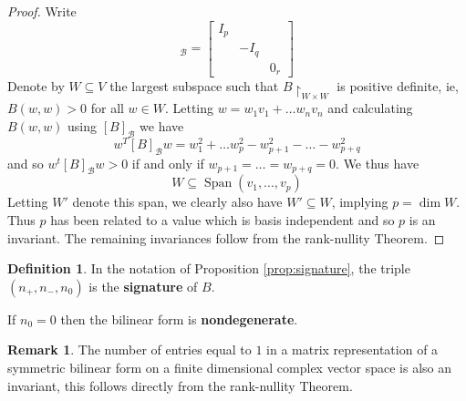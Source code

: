 \documentclass[12pt]{article}
\theoremstyle{plain}
\theoremstyle{definition}
\newtheorem{defn}[thm]{Definition} %
\newtheorem{remark}[thm]{Remark}
\newcommand{\scr}[1]{\mathscr{#1}}
\begin{document}
\begin{proof}
Write
\begin{equation}
[B]_{\scr{B}} = 
\begin{bmatrix}
I_{p} & &\\
& -I_{q} &\\
& & 0_{r}
\end{bmatrix}
\end{equation}
Denote by $W \subseteq V$ the largest subspace such that $B\restriction_{W \times W}$ is positive definite, ie, $B(w,w) > 0$ for all $w\in W$.  Letting $w = w_1v_1 + \hdots w_nv_n$ and calculating $B(w,w)$ using $[B]_{\scr{B}}$ we have
\begin{equation}
w^T[B]_{\scr{B}}w = w_1^2 + \hdots w_p^2 - w_{p+1}^2 - \hdots - w_{p+q}^2
\end{equation}
and so $w^t[B]_{\scr{B}}w >0$ if and only if $w_{p+1} = \hdots = w_{p+q} = 0$. We thus have $$W \subseteq \operatorname{Span}(v_1,...,v_p)$$ Letting $W'$ denote this span, we clearly also have $W' \subseteq W$, implying $p = \operatorname{dim}W$. Thus $p$ has been related to a value which is basis independent and so $p$ is an invariant. The remaining invariances follow from the rank-nullity Theorem.
\end{proof}

\begin{defn}
In the notation of Proposition \ref{prop:signature}, the triple $(n_{+},n_{-},n_0)$ is the \textbf{signature} of $B$.

If $n_0 = 0$ then the bilinear form is \textbf{nondegenerate}.
\end{defn}

\begin{remark}\label{rmk:signature_complex}
The number of entries equal to $1$ in a matrix representation of a symmetric bilinear form on a finite dimensional complex vector space is also an invariant, this follows directly from the rank-nullity Theorem.
\end{remark}
\end{document}
